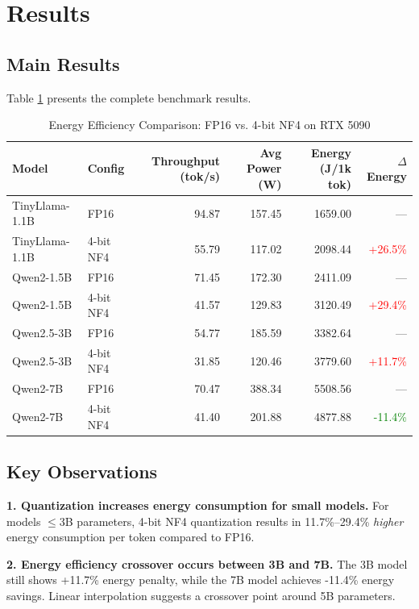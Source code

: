 \documentclass[11pt]{article}
\begin{document}
\section{Results}

\subsection{Main Results}

Table \ref{tab:main_results} presents the complete benchmark results.

\begin{table}[t]
\centering
\caption{Energy Efficiency Comparison: FP16 vs. 4-bit NF4 on RTX 5090}
\label{tab:main_results}
\begin{tabular}{llrrrr}
\toprule
\textbf{Model} & \textbf{Config} & \textbf{Throughput (tok/s)} & \textbf{Avg Power (W)} & \textbf{Energy (J/1k tok)} & \textbf{$\Delta$ Energy} \\
\midrule
TinyLlama-1.1B & FP16 & 94.87 & 157.45 & 1659.00 & --- \\
TinyLlama-1.1B & 4-bit NF4 & 55.79 & 117.02 & 2098.44 & \textcolor{red}{+26.5\%} \\
\midrule
Qwen2-1.5B & FP16 & 71.45 & 172.30 & 2411.09 & --- \\
Qwen2-1.5B & 4-bit NF4 & 41.57 & 129.83 & 3120.49 & \textcolor{red}{+29.4\%} \\
\midrule
Qwen2.5-3B & FP16 & 54.77 & 185.59 & 3382.64 & --- \\
Qwen2.5-3B & 4-bit NF4 & 31.85 & 120.46 & 3779.60 & \textcolor{red}{+11.7\%} \\
\midrule
Qwen2-7B & FP16 & 70.47 & 388.34 & 5508.56 & --- \\
Qwen2-7B & 4-bit NF4 & 41.40 & 201.88 & 4877.88 & \textcolor{green}{-11.4\%} \\
\bottomrule
\end{tabular}
\end{table}

\subsection{Key Observations}

\textbf{1. Quantization increases energy consumption for small models.} For models $\leq$3B parameters, 4-bit NF4 quantization results in 11.7\%--29.4\% \textit{higher} energy consumption per token compared to FP16.

\textbf{2. Energy efficiency crossover occurs between 3B and 7B.} The 3B model still shows +11.7\% energy penalty, while the 7B model achieves -11.4\% energy savings. Linear interpolation suggests a crossover point around 5B parameters.
\end{document}
